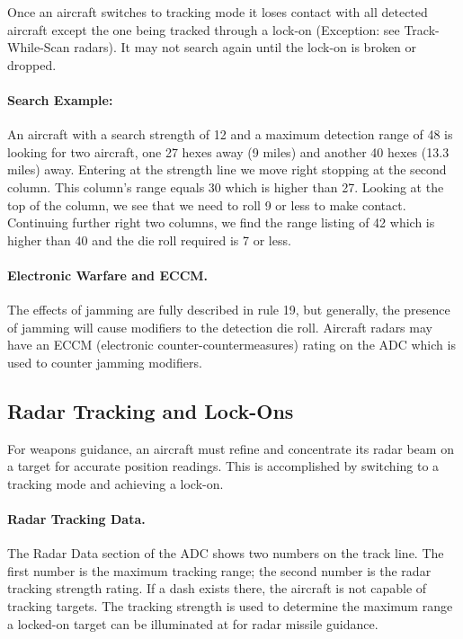 Once an aircraft switches to tracking mode it loses contact with all detected aircraft except the one being tracked through a lock-on (Exception: see Track-While-Scan radars). It may not search again until the lock-on is broken or dropped. 

\paragraph{Search Example:} An aircraft with a search strength of 12 and a maximum detection range of 48 is looking for two aircraft, one 27 hexes away (9 miles) and another 40 hexes (13.3 miles) away. Entering at the strength line we move right stopping at the second column. This column's range equals 30 which is higher than 27. Looking at the top of the column, we see that we need to roll 9 or less to make contact. Continuing further right two columns, we find the range listing of 42 which is higher than 40 and the die roll required is 7 or less.

\paragraph{Electronic Warfare and ECCM.} The effects of jamming are fully described in rule 19, but generally, the presence of jamming will cause modifiers to the detection die roll. Aircraft radars may have an ECCM (electronic counter-countermeasures) rating on the ADC which is used to counter jamming modifiers.

\subsection{Radar Tracking and Lock-Ons}

For weapons guidance, an aircraft must refine and concentrate its radar beam on a target for accurate position readings. This is accomplished by switching to a tracking mode and achieving a lock-on.

\paragraph{Radar Tracking Data.} The Radar Data section of the ADC shows two numbers on the track line. The first number is the maximum tracking range; the second number is the radar tracking strength rating. If a dash exists there, the aircraft is not capable of tracking targets. The tracking strength is used to determine the maximum range a locked-on target can be illuminated at for radar missile guidance.


